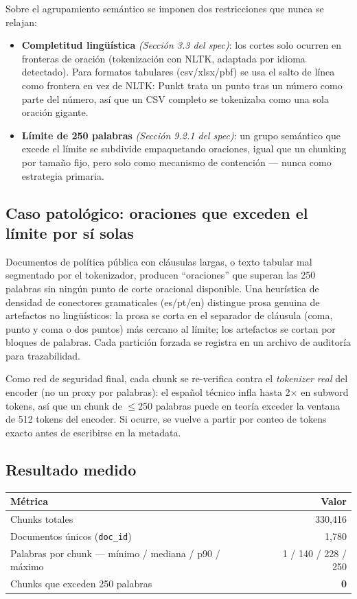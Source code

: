 \documentclass[11pt]{article}
\newcommand{\codigo}[1]{\texttt{\small #1}}
\newcommand{\seccionspec}[1]{\textit{(Sección #1 del spec)}}
\begin{document}
Sobre el agrupamiento semántico se imponen dos restricciones que nunca se
relajan:

\begin{itemize}
\item \textbf{Completitud lingüística} \seccionspec{3.3}: los cortes solo
ocurren en fronteras de oración (tokenización con NLTK, adaptada por idioma
detectado). Para formatos tabulares (csv/xlsx/pbf) se usa el salto de línea
como frontera en vez de NLTK: Punkt trata un punto tras un número como parte
del número, así que un CSV completo se tokenizaba como una sola oración
gigante.
\item \textbf{Límite de 250 palabras} \seccionspec{9.2.1}: un grupo semántico
que excede el límite se subdivide empaquetando oraciones, igual que un
chunking por tamaño fijo, pero solo como mecanismo de contención --- nunca
como estrategia primaria.
\end{itemize}

\subsection{Caso patológico: oraciones que exceden el límite por sí solas}

Documentos de política pública con cláusulas largas, o texto tabular mal
segmentado por el tokenizador, producen ``oraciones'' que superan las 250
palabras sin ningún punto de corte oracional disponible. Una heurística de
densidad de conectores gramaticales (es/pt/en) distingue prosa genuina de
artefactos no lingüísticos: la prosa se corta en el separador de cláusula
(coma, punto y coma o dos puntos) más cercano al límite; los artefactos se
cortan por bloques de palabras. Cada partición forzada se registra en un
archivo de auditoría para trazabilidad.

Como red de seguridad final, cada chunk se re-verifica contra el
\emph{tokenizer real} del encoder (no un proxy por palabras): el español
técnico infla hasta 2$\times$ en subword tokens, así que un chunk de
$\le$250 palabras puede en teoría exceder la ventana de 512 tokens del
encoder. Si ocurre, se vuelve a partir por conteo de tokens exacto antes de
escribirse en la metadata.

\subsection{Resultado medido}

\begin{center}
\begin{tabular}{@{}lr@{}}
\toprule
\textbf{Métrica} & \textbf{Valor} \\
\midrule
Chunks totales & 330{,}416 \\
Documentos únicos (\codigo{doc\_id}) & 1{,}780 \\
Palabras por chunk --- mínimo / mediana / p90 / máximo & 1 / 140 / 228 / 250 \\
Chunks que exceden 250 palabras & \textbf{0} \\
\bottomrule
\end{tabular}
\end{center}
\end{document}

